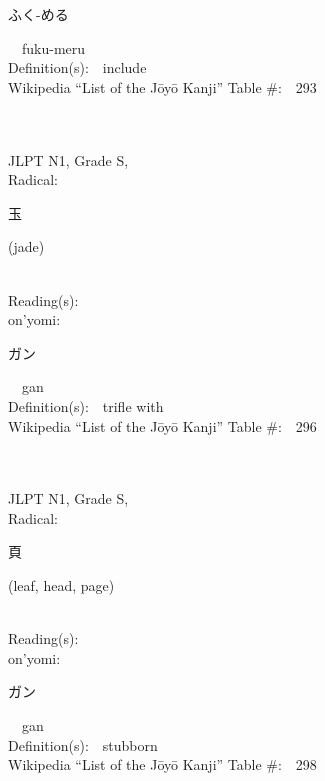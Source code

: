 \begin{multicols}{2}
{\hspace*{2em}}{\begin{CJK}{UTF8}{min} ふく-める \end{CJK}}\ \ fuku-meru\ \ \\
Definition(s):\ \ include \\
Wikipedia ``List of the J\=oy\=o Kanji'' Table \#:\ \ 293 \\
\ \ \\
{\fontsize{34pt}{40pt}  }\ \ \\
{JLPT N1, Grade S, \\Radical:\ \ {\begin{CJK}{UTF8}{min} 玉 \end{CJK}} (jade) } \\
Reading(s):\ \ \\
{\hspace*{1em}}on'yomi:\ \ \\
{\hspace*{2em}}{\begin{CJK}{UTF8}{min} ガン \end{CJK}}\ \ gan\ \ \\
Definition(s):\ \ trifle with \\
Wikipedia ``List of the J\=oy\=o Kanji'' Table \#:\ \ 296 \\
\ \ \\
{\fontsize{34pt}{40pt}  }\ \ \\
{JLPT N1, Grade S, \\Radical:\ \ {\begin{CJK}{UTF8}{min} 頁 \end{CJK}} (leaf, head, page) } \\
Reading(s):\ \ \\
{\hspace*{1em}}on'yomi:\ \ \\
{\hspace*{2em}}{\begin{CJK}{UTF8}{min} ガン \end{CJK}}\ \ gan\ \ \\
Definition(s):\ \ stubborn \\
Wikipedia ``List of the J\=oy\=o Kanji'' Table \#:\ \ 298 \\
\ \ \\
{\fontsize{34pt}{40pt}  }\ \ \\

\end{multicols}
